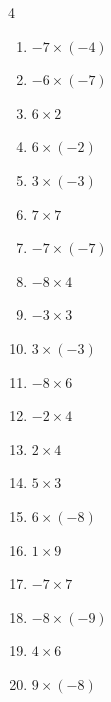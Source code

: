 \begin{multicols}{4}
\begin{enumerate}
  \item $-7\times (-4)$
        \phantom{$=28$}

  \item $-6\times (-7)$
        \phantom{$=42$}

  \item $6\times 2$
        \phantom{$=12$}

  \item $6\times (-2)$
        \phantom{$=-12$}

  \item $3\times (-3)$
        \phantom{$=-9$}

\columnbreak %

  \item $7\times 7$
        \phantom{$=49$}

  \item $-7\times (-7)$
        \phantom{$=49$}

  \item $-8\times 4$
        \phantom{$=-32$}

  \item $-3\times 3$
        \phantom{$=-9$}

  \item $3\times (-3)$
        \phantom{$=-9$}

  \item $-8\times 6$
        \phantom{$=-48$}

  \item $-2\times 4$
        \phantom{$=-8$}

  \item $2\times 4$
        \phantom{$=8$}

  \item $5\times 3$
        \phantom{$=15$}

  \item $6\times (-8)$
        \phantom{$=-48$}

  \item $1\times 9$
        \phantom{$=9$}

  \item $-7\times 7$
        \phantom{$=-49$}

  \item $-8\times (-9)$
        \phantom{$=72$}

  \item $4\times 6$
        \phantom{$=24$}

  \item $9\times (-8)$
        \phantom{$=-72$}


\end{enumerate}
\end{multicols}
